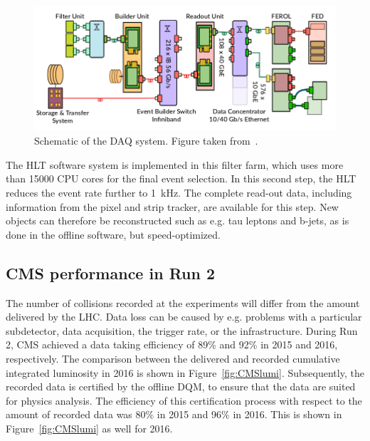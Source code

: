 \begin{figure}[ht]
  \centering
 \includegraphics[width=.9\textwidth]{DAQ}
 \caption{Schematic of the \protect\acf{DAQ} system. Figure taken from~\cite{Andre:2252634}.}
 \label{fig:DAQ}
\end{figure}

The \ac{HLT} software system is implemented in this filter farm, which uses more than \SI{15000}{} CPU cores for the final event selection. In this second step, the \ac{HLT} reduces the event rate further to \SI{1}{kHz}. The complete read-out data, including information from the pixel and strip tracker, are available for this step. New objects can therefore be reconstructed such as e.g. tau leptons and b-jets, as is done in the offline software, but speed-optimized.%

\subsection{CMS performance in Run 2}
\label{sec:CMS_performance}

The number of collisions recorded at the experiments will differ from the amount delivered by the \ac{LHC}. Data loss can be caused by e.g. problems with a particular subdetector, data acquisition, the trigger rate, or the infrastructure. During Run 2, CMS achieved a data taking efficiency of 89\% and 92\% in 2015 and 2016, respectively. The comparison between the delivered and recorded cumulative integrated luminosity in 2016 is shown in Figure~\ref{fig:CMSlumi}. Subsequently, the recorded data is certified by the offline \ac{DQM}, to ensure that the data are suited for physics analysis. The efficiency of this certification process with respect to the amount of recorded data was 80\% in 2015 and 96\% in 2016. This is shown in Figure~\ref{fig:CMSlumi} as well for 2016.

